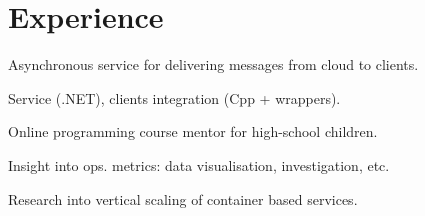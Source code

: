 \documentclass[a4paper]{deedy-resume} %
\begin{document}
\begin{minipage}[t]{0.62\textwidth} %


\section{Experience}


\vspace{\topsep} %
\begin{tightitemize}
\item Asynchronous service for delivering messages from cloud to clients.
\item Service (.NET), clients integration (Cpp + wrappers).
\end{tightitemize}

\halfsectionspace %


\begin{tightitemize}
\item Online programming course mentor for high-school children.
\end{tightitemize}

\halfsectionspace %



\begin{tightitemize}
\item Insight into ops. metrics: data visualisation, investigation, etc.
\item Research into vertical scaling of container based services.
\end{tightitemize}

\halfsectionspace %


\end{minipage}
\end{document}
